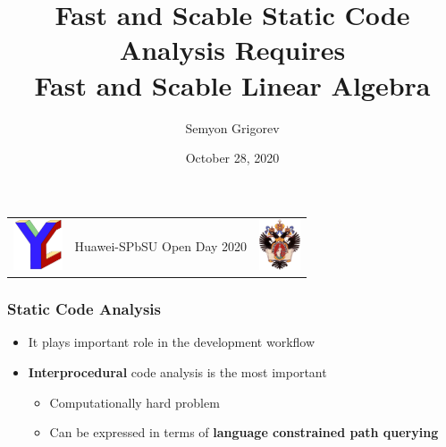 \documentclass[xcolor=table]{beamer}
\title[Static Code Analysis and Linear Algebra]{Fast and Scable Static Code Analysis Requires \\ Fast and Scable Linear Algebra}
\institute[SPbSU]{
Saint Petersburg State University
}
\author[Semyon Grigorev]{Semyon Grigorev}
\date{October 28, 2020}
\begin{document}
{
\begin{frame}[fragile]
  \begin{table}
  \centering
  \begin{tabularx}{\linewidth}{XcX}
    \includegraphics[height=1.5cm]{pictures/YC_logo.pdf} \hfill
    & \begin{minipage}[t]{0.3\textwidth}\center \vspace{-1cm}  Huawei-SPbSU Open Day 2020
      \end{minipage}
    & \hfill \includegraphics[height=1.5cm]{pictures/SPbGU_Logo.png}
  \end{tabularx}
  \end{table}
  \titlepage
\end{frame}
}


\begin{frame}[fragile]
  \frametitle{Static Code Analysis}
  \begin{itemize}
  \item It plays important role in the development workflow
  \item \textbf{Interprocedural} code analysis is the most important 
  \begin{itemize}
    \item Computationally hard problem
    \item Can be expressed in terms of \textbf{language constrained path querying} 
  \end{itemize}
  \end{itemize}
\end{frame}
\end{document}
